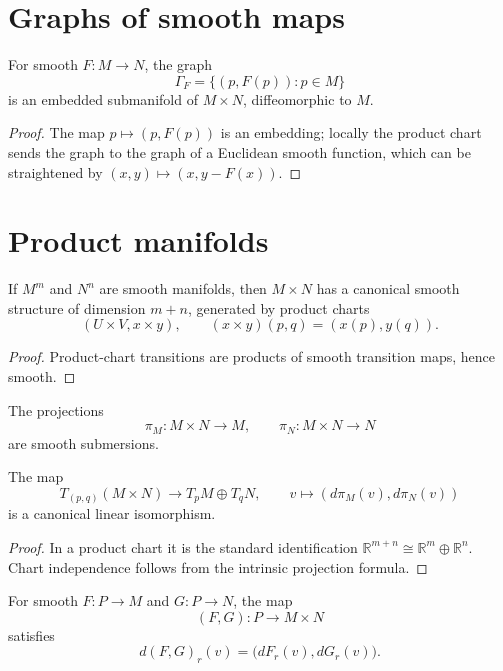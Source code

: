 \section{Graphs of smooth maps}
\begin{theorem}\label{thm:vii06-graph}
For smooth \(F:M\to N\), the graph
\[
\Gamma_F=\{(p,F(p)):p\in M\}
\]
is an embedded submanifold of \(M\times N\), diffeomorphic to \(M\).
\end{theorem}
\begin{proof}
The map \(p\mapsto(p,F(p))\) is an embedding; locally the product chart sends the graph to the graph of a Euclidean smooth function, which can be straightened by \((x,y)\mapsto(x,y-F(x))\).
\end{proof}

\section{Product manifolds}
\begin{theorem}\label{thm:vii06-product-manifold}
If \(M^m\) and \(N^n\) are smooth manifolds, then \(M\times N\) has a canonical smooth structure of dimension \(m+n\), generated by product charts
\[
(U\times V,x\times y),\qquad
(x\times y)(p,q)=(x(p),y(q)).
\]
\end{theorem}
\begin{proof}
Product-chart transitions are products of smooth transition maps, hence smooth.
\end{proof}

\begin{proposition}\label{prop:vii06-projections}
The projections
\[
\pi_M:M\times N\to M,\qquad \pi_N:M\times N\to N
\]
are smooth submersions.
\end{proposition}

\begin{theorem}\label{thm:vii06-tangent-product}
The map
\[
T_{(p,q)}(M\times N)\to T_pM\oplus T_qN,
\qquad
v\mapsto(d\pi_M(v),d\pi_N(v))
\]
is a canonical linear isomorphism.
\end{theorem}
\begin{proof}
In a product chart it is the standard identification
\(\mathbb R^{m+n}\cong\mathbb R^m\oplus\mathbb R^n\). Chart independence follows from the intrinsic projection formula.
\end{proof}

\begin{corollary}\label{cor:vii06-product-map}
For smooth \(F:P\to M\) and \(G:P\to N\), the map
\[
(F,G):P\to M\times N
\]
satisfies
\[
d(F,G)_r(v)=\bigl(dF_r(v),dG_r(v)\bigr).
\]
\end{corollary}

